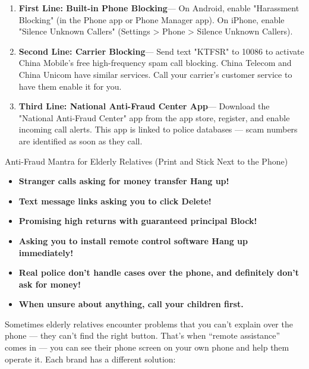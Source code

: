 \begin{enumerate}
  \item \textbf{First Line: Built-in Phone Blocking}— On Android, enable "Harassment Blocking" (in the Phone app or Phone Manager app). On iPhone, enable "Silence Unknown Callers" (Settings > Phone > Silence Unknown Callers).
  \item \textbf{Second Line: Carrier Blocking}— Send text "KTFSR" to 10086 to activate China Mobile's free high-frequency spam call blocking. China Telecom and China Unicom have similar services. Call your carrier's customer service to have them enable it for you.
  \item \textbf{Third Line: National Anti-Fraud Center App}— Download the "National Anti-Fraud Center" app from the app store, register, and enable incoming call alerts. This app is linked to police databases — scam numbers are identified as soon as they call.
\end{enumerate}

\begin{tcbwarn}{Anti-Fraud Mantra for Elderly Relatives (Print and Stick Next to the Phone)}
\begin{itemize}
  \item \textbf{Stranger calls asking for money transfer Hang up!}
  \item \textbf{Text message links asking you to click Delete!}
  \item \textbf{Promising high returns with guaranteed principal Block!}
  \item \textbf{Asking you to install remote control software Hang up immediately!}
  \item \textbf{Real police don't handle cases over the phone, and definitely don't ask for money!}
  \item \textbf{When unsure about anything, call your children first.}
\end{itemize}

\end{tcbwarn}


Sometimes elderly relatives encounter problems that you can't explain over the phone — they can't find the right button. That's when “remote assistance” comes in — you can see their phone screen on your own phone and help them operate it. Each brand has a different solution:

